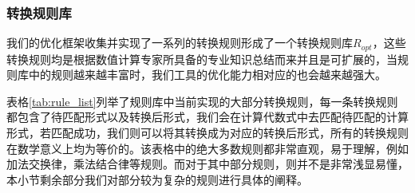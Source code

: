 \subsubsection{转换规则库}

我们的优化框架收集并实现了一系列的转换规则形成了一个转换规则库$R_{opt}$，这些转换规则均是根据数值计算专家所具备的专业知识总结而来并且是可扩展的，当规则库中的规则越来越丰富时，我们工具的优化能力相对应的也会越来越强大。
 
表格\ref{tab:rule_list}列举了规则库中当前实现的大部分转换规则，每一条转换规则都包含了待匹配形式以及转换后形式，我们会在计算代数式中去匹配待匹配的计算形式，若匹配成功，我们则可以将其转换成为对应的转换后形式，所有的转换规则在数学意义上均为等价的。该表格中的绝大多数规则都非常直观，易于理解，例如加法交换律，乘法结合律等规则。而对于其中部分规则，则并不是非常浅显易懂，本小节剩余部分我们对部分较为复杂的规则进行具体的阐释。


